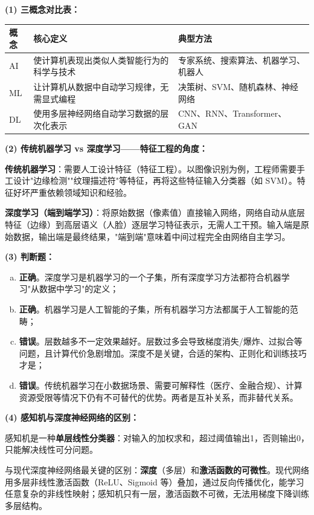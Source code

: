 \documentclass[a4paper,11pt]{ctexart}
\begin{document}
\begin{solutionbox}[参考答案与详细解析]
    \textbf{(1) 三概念对比表：}

    \begin{center}
    \begin{tabular}{p{2.5cm} p{4.3cm} p{4.0cm}}
        \toprule
        概念 & 核心定义 & 典型方法 \\
        \midrule
        AI & 使计算机表现出类似人类智能行为的科学与技术 & 专家系统、搜索算法、机器学习、机器人 \\[0.8em]
        ML & 让计算机从数据中自动学习规律，无需显式编程 & 决策树、SVM、随机森林、神经网络 \\[0.8em]
        DL & 使用多层神经网络自动学习数据的层次化表示 & CNN、RNN、Transformer、GAN \\
        \bottomrule
    \end{tabular}
    \end{center}

    \textbf{(2) 传统机器学习 vs 深度学习——特征工程的角度：}

    \textbf{传统机器学习}：需要人工设计特征（特征工程）。以图像识别为例，工程师需要手工设计"边缘检测""纹理描述符"等特征，再将这些特征输入分类器（如 SVM）。特征好坏严重依赖领域知识和经验。

    \textbf{深度学习（端到端学习）}：将原始数据（像素值）直接输入网络，网络自动从底层特征（边缘）到高层语义（人脸）逐层学习特征表示，无需人工干预。输入端是原始数据，输出端是最终结果，"端到端"意味着中间过程完全由网络自主学习。

    \textbf{(3) 判断题：}

    \begin{enumerate}[a.]
        \item \textbf{正确}。深度学习是机器学习的一个子集，所有深度学习方法都符合机器学习"从数据中学习"的定义；
        \item \textbf{正确}。机器学习是人工智能的子集，所有机器学习方法都属于人工智能的范畴；
        \item \textbf{错误}。层数越多不一定效果越好。层数过多会导致梯度消失/爆炸、过拟合等问题，且计算代价急剧增加。深度不是关键，合适的架构、正则化和训练技巧才是；
        \item \textbf{错误}。传统机器学习在小数据场景、需要可解释性（医疗、金融合规）、计算资源受限等情况下仍有不可替代的优势。两者是互补关系，而非替代关系。
    \end{enumerate}

    \textbf{(4) 感知机与深度神经网络的区别：}

    感知机是一种\textbf{单层线性分类器}：对输入的加权求和，超过阈值输出1，否则输出0，只能解决线性可分问题。

    与现代深度神经网络最关键的区别：\textbf{深度}（多层）和\textbf{激活函数的可微性}。现代网络用多层非线性激活函数（ReLU、Sigmoid 等）叠加，通过反向传播优化，能学习任意复杂的非线性映射；感知机只有一层，激活函数不可微，无法用梯度下降训练多层结构。
\end{solutionbox}
\end{document}
